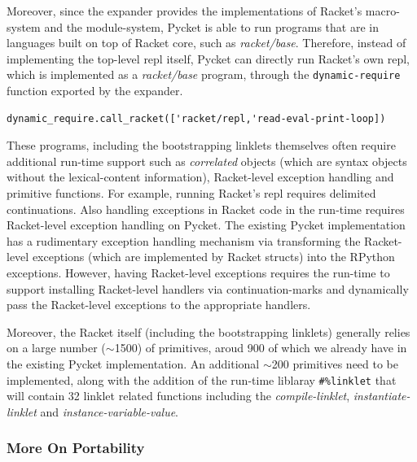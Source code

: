 Moreover, since the expander provides the implementations of Racket's
macro-system and the module-system, Pycket is able to run programs
that are in languages built on top of Racket core, such as
\emph{racket/base}. Therefore, instead of implementing the top-level
repl itself, Pycket can directly run Racket's own repl, which is
implemented as a \emph{racket/base} program, through the
\verb|dynamic-require| function exported by the expander.

{\footnotesize
\begin{lstlisting}[mathescape]
  dynamic_require.call_racket(['racket/repl,'read-eval-print-loop])
\end{lstlisting}
}

These programs, including the bootstrapping linklets themselves often
require additional run-time support such as \emph{correlated} objects
(which are syntax objects without the lexical-content information),
Racket-level exception handling and primitive functions. For example,
running Racket's repl requires delimited continuations. Also handling
exceptions in Racket code in the run-time requires Racket-level
exception handling on Pycket. The existing Pycket implementation has a
rudimentary exception handling mechanism via transforming the
Racket-level exceptions (which are implemented by Racket structs) into
the RPython exceptions. However, having Racket-level exceptions
requires the run-time to support installing Racket-level handlers via
continuation-marks and dynamically pass the Racket-level exceptions to
the appropriate handlers.

Moreover, the Racket itself (including the bootstrapping linklets)
generally relies on a large number ($\sim$1500) of primitives, aroud 900
of which we already have in the existing Pycket implementation. An
additional $\sim$200 primitives need to be implemented, along with the
addition of the run-time liblaray \texttt{\#\%linklet} that will
contain 32 linklet related functions including the
\emph{compile-linklet}, \emph{instantiate-linklet} and
\emph{instance-variable-value}.

\subsubsection{More On Portability}
\label{subsec:more-portability}


